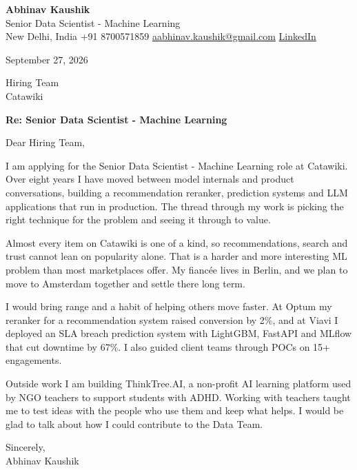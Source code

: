 \documentclass[11pt,a4paper]{article}
\begin{document}
{\Large\bfseries Abhinav Kaushik}\\
Senior Data Scientist - Machine Learning\\
New Delhi, India \textbar{} +91 8700571859 \textbar{} \href{mailto:aabhinav.kaushik@gmail.com}{aabhinav.kaushik@gmail.com} \textbar{} \href{https://www.linkedin.com/in/abhinav-kaushik10/}{LinkedIn}  

September 27, 2026

Hiring Team\\
Catawiki

\textbf{Re: Senior Data Scientist - Machine Learning}

Dear Hiring Team,

I am applying for the Senior Data Scientist - Machine Learning role at Catawiki. Over eight years I have moved between model internals and product conversations, building a recommendation reranker, prediction systems and LLM applications that run in production. The thread through my work is picking the right technique for the problem and seeing it through to value.

Almost every item on Catawiki is one of a kind, so recommendations, search and trust cannot lean on popularity alone. That is a harder and more interesting ML problem than most marketplaces offer. My fiancée lives in Berlin, and we plan to move to Amsterdam together and settle there long term.

I would bring range and a habit of helping others move faster. At Optum my reranker for a recommendation system raised conversion by 2\%, and at Viavi I deployed an SLA breach prediction system with LightGBM, FastAPI and MLflow that cut downtime by 67\%. I also guided client teams through POCs on 15+ engagements.

Outside work I am building ThinkTree.AI, a non-profit AI learning platform used by NGO teachers to support students with ADHD. Working with teachers taught me to test ideas with the people who use them and keep what helps. I would be glad to talk about how I could contribute to the Data Team.

Sincerely,\\[4pt]
Abhinav Kaushik
\end{document}
